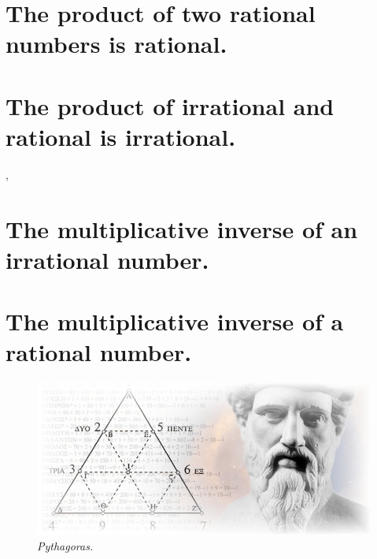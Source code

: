 \documentclass[preview]{standalone}
\begin{document}
\section{The product of two rational numbers is rational.}

\pagebreak


\section{The product of irrational and rational is irrational.}

\sep


\section{The multiplicative inverse of an irrational number.}

\pagebreak


\section{The multiplicative inverse of a rational number.}

\begin{figure}[h!]
    \centering
    \includegraphics[width=13cm]{../resources/jpg/1.6.introduction.to.proofs/pythagoras.jpg}
    \caption*{\emph{Pythagoras.}}
\end{figure}


\end{document}
